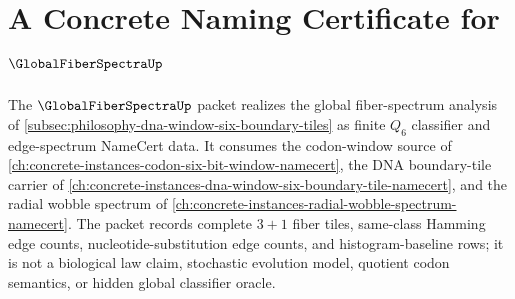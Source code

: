 \chapter{A Concrete Naming Certificate for $\GlobalFiberSpectraUp$}
\label{ch:concrete-instances-global-fiber-spectra-namecert}

The $\GlobalFiberSpectraUp$ packet realizes the global fiber-spectrum analysis of \autoref{subsec:philosophy-dna-window-six-boundary-tiles} as finite $Q_{6}$ classifier and edge-spectrum NameCert data. It consumes the codon-window source of \autoref{ch:concrete-instances-codon-six-bit-window-namecert}, the DNA boundary-tile carrier of \autoref{ch:concrete-instances-dna-window-six-boundary-tile-namecert}, and the radial wobble spectrum of \autoref{ch:concrete-instances-radial-wobble-spectrum-namecert}. The packet records complete $3+1$ fiber tiles, same-class Hamming edge counts, nucleotide-substitution edge counts, and histogram-baseline rows; it is not a biological law claim, stochastic evolution model, quotient codon semantics, or hidden global classifier oracle.

